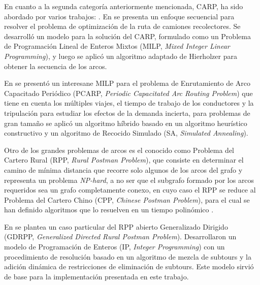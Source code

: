 En cuanto a la segunda categoría anteriormente mencionada, CARP, ha sido abordado por varios trabajos: \citet{Vecchi2016ACollection,Tirkolaee2018ATime,Braier2017AnArgentina}. En \citet{Vecchi2016ACollection} se presenta un enfoque secuencial para resolver el problema de optimización de la ruta de camiones recolectores. Se desarrolló un modelo para la solución del CARP, formulado como un Problema de Programación Lineal de Enteros Mixtos (MILP, \textit{Mixed Integer Linear Programming}), y luego se aplicó un algoritmo adaptado de Hierholzer para obtener la secuencia de los arcos. 

En \citet{Tirkolaee2018ATime} se presentó un interesane MILP para el problema de Enrutamiento de Arco Capacitado Periódico (PCARP, \textit{Periodic Capacitated Arc Routing Problem}) que tiene en cuenta los múltiples viajes, el tiempo de trabajo de los conductores y la tripulación para estudiar los efectos de la demanda incierta, para problemas de gran tamaño se aplicó un algoritmo híbrido basado en un algoritmo heurístico constructivo y un algoritmo de Recocido Simulado (SA, \textit{Simulated Annealing}).

Otro de los grandes problemas de arcos es el conocido como Problema del Cartero Rural (RPP, \textit{Rural Postman Problem}), que consiste en determinar el camino de mínima distancia que recorre solo algunos de los arcos del grafo y representa un problema \textit{NP-hard}, a no ser que el subgrafo formado por los arcos requeridos sea un grafo completamente conexo, en cuyo caso el RPP se reduce al Problema del Cartero Chino (CPP, \textit{Chinese Postman Problem}), para el cual se han definido algoritmos que lo resuelven en un tiempo polinómico \citep{CalvinoM2011CooperacionPanoramica}.

En \citet{Braier2017AnArgentina} se plantea un caso particular del RPP abierto Generalizado Dirigido (GDRPP, \textit{Generalized Directed Rural Postman Problem}). Desarrollaron un modelo de Programación de Enteros (IP, \textit{Integer Programming}) con un procedimiento de resolución basado en un algoritmo de mezcla de subtours y la adición dinámica de restricciones de eliminación de subtours. Este modelo sirvió de base para la implementación presentada en este trabajo.


